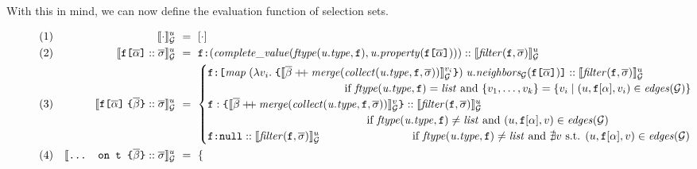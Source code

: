 With this in mind, we can now define the evaluation function of
selection sets.

\begin{figure}[h!]
  \small
  \begin{flushright}
  \end{flushright}
  \centering
    \vspace{-1ex}
    \begin{align*}
    & (1) & \llbracket \cdot \rrbracket^{u}_{\mathcal{G}} &~=~ [\cdot] \\
    & (2) & \llbracket \texttt{f[}\overline{\alpha}\texttt{]} :: \overline{\sigma} \rrbracket^{u}_{\mathcal{G}} &~=~ 
        \texttt{f}\texttt{:}(\mathit{complete\_value(ftype (u.type, \texttt{f}), u.property(\texttt{f[}\overline{\alpha}\texttt{]}))}) :: \llbracket \mathit{filter (\texttt{f}, \overline{\sigma})} \rrbracket^{u}_{\mathcal{G}}  \\
    & (3) & \llbracket \texttt{f[}\overline{\alpha}\texttt{]}\; \texttt{\{}\overline{\beta}\texttt{\}} :: \overline{\sigma} \rrbracket^{u}_{\mathcal{G}} &~=~
    \begin{cases}
        \texttt{f}\texttt{:}\texttt{[} \mathit{map}\; (\lambda v_{i}.\; \texttt{\{} \llbracket \overline{\beta} \mathbin{+\mkern-5mu+} \mathit{merge (collect(u.type, \texttt{f}, \overline{\sigma}))} \rrbracket^{v_{i}}_{\mathcal{G}} \texttt{\}})\; \mathit{u.neighbors_{\mathcal{G}}(\texttt{f[}\overline{\alpha}\texttt{]})} \texttt{]} :: \llbracket \mathit{filter (\texttt{f}, \overline{\sigma})} \rrbracket^{u}_{\mathcal{G}} \\  
             \qquad \qquad \qquad \qquad \qquad \qquad
			 \text{ if } 
            \mathit{ftype (u.type, \texttt{f})} = \mathit{list} \text{ and } \{v_{1}, \ldots, v_{k}\} = 
        \{v_{i} \mid (u, \texttt{f}[\alpha], v_{i}) \in \mathit{edges}(\mathcal{G})\} \\
    \texttt{f}:\texttt{\{}\llbracket \overline{\beta} \mathbin{+\mkern-5mu+} \mathit{merge (collect(u.type, \texttt{f}, \overline{\sigma}))} \rrbracket^{v}_{\mathcal{G}}\texttt{\}} ::  \llbracket \mathit{filter (\texttt{f}, \overline{\sigma})} \rrbracket^{u}_{\mathcal{G}}  \\
         \qquad \qquad \qquad \qquad \qquad \qquad \qquad
		 \text{ if } 
        \mathit{ftype (u.type, \texttt{f})}  \neq \mathit{list} \text{ and } (u, \texttt{f}[\alpha], v) \in \mathit{edges}(\mathcal{G}) \\
    \texttt{f}\texttt{:}\texttt{null} :: \llbracket \mathit{filter (\texttt{f}, \overline{\sigma})} \rrbracket^{u}_{\mathcal{G}} 
    \qquad \qquad \qquad \qquad 
  \text{ if } \mathit{ftype (u.type, \texttt{f})}  \neq \mathit{list}  \text{ and } \nexists v \text{ s.t. }  (u, \texttt{f}[\alpha], v) \in \mathit{edges}(\mathcal{G}) \\
    \end{cases}\\
    & (4) & \llbracket \texttt{... on t \{}\overline{\beta}\texttt{\}} :: \overline{\sigma} \rrbracket^{u}_{\mathcal{G}} &~=~ 
    \begin{cases}

\end{cases}
\end{align*}
\end{figure}
